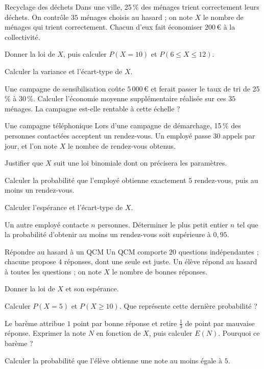 \begin{exercice}[3]{Recyclage des déchets}
Dans une ville, 25\,\% des ménages trient correctement leurs déchets. On contrôle $35$ ménages choisis au hasard ; on note $X$ le
nombre de ménages qui trient correctement. Chacun d'eux fait économiser $200$\,€ à la collectivité.
\begin{questions}
  \item Donner la loi de $X$, puis calculer $P(X=10)$ et $P(6\leq X\leq12)$.
  \item Calculer la variance et l'écart-type de $X$.
  \item Une campagne de sensibilisation coûte $5\,000$\,€ et ferait passer le taux de tri de 25\,\% à 30\,\%. Calculer l'économie
    moyenne supplémentaire réalisée sur ces $35$ ménages. La campagne est-elle rentable à cette échelle ?
\end{questions}
\end{exercice}

\begin{exercice}[3]{Une campagne téléphonique}
Lors d'une campagne de démarchage, 15\,\% des personnes contactées acceptent un rendez-vous. Un employé passe $30$ appels par jour,
et l'on note $X$ le nombre de rendez-vous obtenus.
\begin{questions}
  \item Justifier que $X$ suit une loi binomiale dont on précisera les paramètres.
  \item Calculer la probabilité que l'employé obtienne exactement $5$ rendez-vous, puis au moins un rendez-vous.
  \item Calculer l'espérance et l'écart-type de $X$.
  \item Un autre employé contacte $n$ personnes. Déterminer le plus petit entier $n$ tel que la probabilité d'obtenir au moins
    un rendez-vous soit supérieure à $0{,}95$.
\end{questions}
\end{exercice}

\begin{exercice}[3]{Répondre au hasard à un QCM}
Un QCM comporte $20$ questions indépendantes ; chacune propose $4$ réponses, dont une seule est juste. Un élève répond au hasard à
toutes les questions ; on note $X$ le nombre de bonnes réponses.
\begin{questions}
  \item Donner la loi de $X$ et son espérance.
  \item Calculer $P(X=5)$ et $P(X\geq10)$. Que représente cette dernière probabilité ?
  \item Le barème attribue $1$ point par bonne réponse et retire $\frac13$ de point par mauvaise réponse. Exprimer la note $N$ en
    fonction de $X$, puis calculer $E(N)$. Pourquoi ce barème ?
  \item Calculer la probabilité que l'élève obtienne une note au moins égale à $5$.
\end{questions}
\end{exercice}

